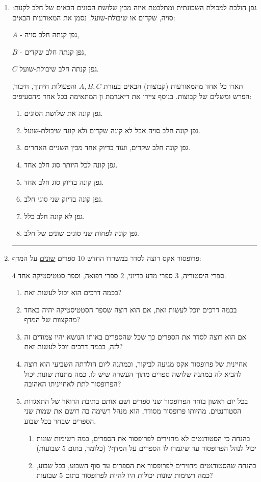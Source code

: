 \documentclass[12pt, a4paper]{article}
\begin{document}
\begin{enumerate}


\item
גפן הולכת למכולת השכונתית ומתלבטת איזה מבין שלושת הסוגים הבאים של חלב לקנות: סויה, שקדים או שיבולת-שועל.
נסמן את המאורעות הבאים:

$A$
-
גפן קנתה חלב סויה,

$B$
-
גפן קנתה חלב שקדים,

$C$
גפן קנתה חלב שיבולת-שועל.

תארו כל אחד מהמאורעות (קבוצות) הבאים בעזרת
$A,B,C$
והפעולות חיתוך, חיבור, הפרש ומשלים של קבוצות. בנוסף ציירו את דיאגרמת ון המתאימה בכל אחד מהסעיפים:
\begin{enumerate}
\item
גפן קונה את שלושת הסוגים.
\item
גפן קונה חלב סויה  אבל לא קונה שקדים ולא קונה שיבולת-שועל.
\item
גפן קונה חלב שקדים, ועוד בדיוק אחד מבין השניים האחרים.
\item
גפן קונה לכל היותר סוג חלב אחד.
\item
גפן קונה בדיוק סוג חלב אחד.
\item
גפן קונה בדיוק שני סוגי חלב.
\item
גפן לא קונה חלב כלל.
\item 
גפן קונה לפחות שני סוגים שונים של חלב.
\end{enumerate}

\noindent\rule{15cm}{0.4pt}

\item
פרופסור אקס רוצה לסדר במשרדו החדש
$10$
ספרים 
\underline{שונים}
על המדף:

$4$
ספרי היסטוריה,
$3$
ספרי מדע בדיוני,
$2$
ספרי רפואה,
וספר סטטיסטיקה אחד.
\begin{enumerate}
\item
בכמה דרכים הוא יכול לעשות זאת?
\item
בכמה דרכים יוכל לעשות זאת, אם הוא רוצה שספר הסטטיסטיקה יהיה באחד מהקצוות של המדף?
\item
אם הוא רוצה לסדר את הספרים כך שכל שהספרים באותו הנושא יהיו צמודים זה לזה, בכמה דרכים יוכל לעשות זאת?
\item
אחיינית של פרופסור אקס מגיעה לביקור, וכמתנה ליום הולדתה השביעי הוא רוצה להביא לה במתנה
שלושה
ספרים מתוך העשרה שיש לו. כמה מתנות שונות יכול הפרופסור לתת לאחייניתו האהובה?
\item
בכל יום ראשון בוחר הפרופסור שני ספרים ושם אותם בתיבת הדואר של התאגדות הסטודנטים. 
מהיותו פרופסור מסודר, הוא מנהל רשימה בה רושם את שמות שני הספרים שבחר בכל שבוע.
\begin{enumerate}
\item[(1)]
בהנחה כי הסטודנטים לא  מחזירים לפרופסור את הספרים,
כמה רשימות שונות יכול לנהל הפרופסור עד שיגמרו לו הספרים על המדף? (כלומר, בתום 
$5$
שבועות)
\item[(2)]
בהנחה
שהסטודנטים מחזירים לפרופסור את הספרים עד סוף השבוע, בכל שבוע, כמה רשימות שונות יכולות היו להיות לפרופסור בתום
$5$
שבועות?
\end{enumerate}
\end{enumerate}


\end{enumerate}
\end{document}

